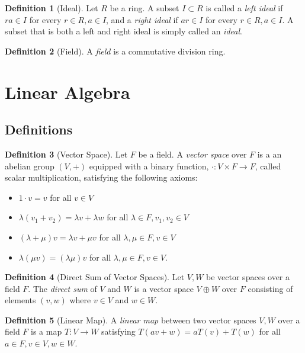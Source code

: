 \documentclass{article}
\theoremstyle{definition}
\newtheorem{definition}{Definition}[subsection]
\begin{document}
    \begin{definition}[Ideal]
        Let $R$ be a ring. A subset $I\subset R$ is called a \textit{left ideal} if $ra\in I$ for every $r\in R, a\in I$, and a \textit{right ideal} if $ar\in I$ for every $r\in R, a\in I$. A subset that is both a left and right ideal is simply called an \textit{ideal}.
    \end{definition}
    \begin{definition}[Field]
        A \textit{field} is a commutative division ring.
    \end{definition}

\section{Linear Algebra}
\setcounter{subsection}{-1}
\subsection{Definitions}
\begin{definition}[Vector Space]
    Let $F$ be a field. A \textit{vector space} over $F$ is a an abelian group $(V,+)$ equipped with a binary function, $\cdot: V\times F\rightarrow F$, called scalar multiplication, satisfying the following axioms:
    \begin{itemize}
        \item $1\cdot v=v$ for all $v\in V$
        \item $\lambda(v_1+v_2)=\lambda v+\lambda w$ for all $\lambda \in {F}, v_1,v_2\in V$
        \item $(\lambda + \mu)v=\lambda v+\mu v$ for all $\lambda,\mu \in {F}, v \in V$
        \item $\lambda(\mu v)=(\lambda \mu)v$ for all $\lambda, \mu\in {F}, v\in V$.
    \end{itemize}
\end{definition}
\begin{definition}[Direct Sum of Vector Spaces]
    Let $V,W$ be vector spaces over a field $F$. The \textit{direct sum} of $V$ and $W$ is a vector space $V\oplus W$ over $F$ consisting of elements $(v,w)$ where $v\in V$ and $w\in W$.
\end{definition}
\begin{definition}[Linear Map]
    A \textit{linear map} between two vector spaces $V,W$ over a field $F$ is a map $T:V\rightarrow W$ satisfying $T(av+w)=aT(v)+T(w)$ for all $a\in F, v\in V, w\in W$.
\end{definition}
\end{document}
